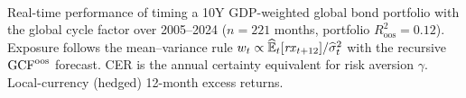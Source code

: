 \\[0.8ex]
{\scriptsize\begin{minipage}{0.92\linewidth}
  Real-time performance of timing a 10Y GDP-weighted global bond portfolio with
  the global cycle factor over 2005--2024 ($n=221$ months, portfolio
  $R^{2}_{\mathrm{oos}}=0.12$). Exposure follows the mean--variance rule
  $w_{t}\propto\widehat{\mathbb{E}}_{t}[\mathit{rx}_{t+12}]/\widehat{\sigma}^{2}_{t}$ with the
  recursive $\mathrm{GCF}^{\mathrm{oos}}$ forecast. CER is the annual certainty equivalent for
  risk aversion $\gamma$. Local-currency (hedged) 12-month excess
  returns.
\end{minipage}}
